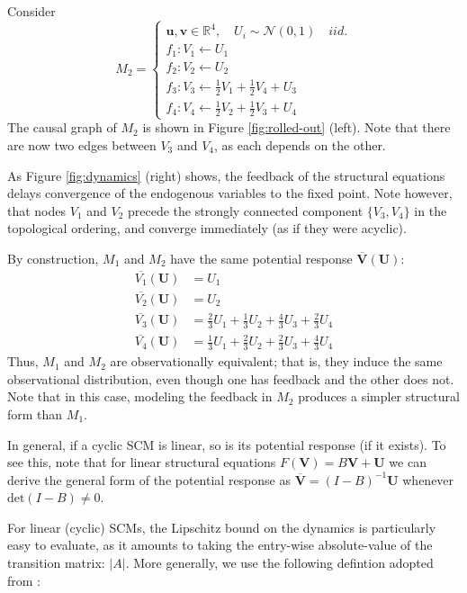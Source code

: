 \documentclass[12pt]{article}
\begin{document}
\begin{example}\label{ex:cyclic-linear}
Consider
\[
M_2 = 
\begin{cases}
\mathbf{u}, \mathbf{v}\in \mathbb{R}^4, \quad U_i \sim \mathcal{N}(0,1) \quad iid. \\
f_1:V_1\leftarrow U_1 \\
f_2:V_2\leftarrow U_2 \\
f_3:V_3\leftarrow \frac{1}{2}V_1+\frac{1}{2}V_4+U_3 \\
f_4:V_4\leftarrow \frac{1}{2}V_2+\frac{1}{2}V_3+U_4
\end{cases}
\]
The causal graph of $M_2$ is shown in Figure \ref{fig:rolled-out} (left).
Note that there are now two edges between $V_3$ and $V_4$, as each depends on the other.

As Figure \ref{fig:dynamics} (right) shows, the feedback of the structural equations delays convergence of the endogenous variables to the fixed point. Note however, that nodes $V_1$ and $V_2$ precede the strongly connected component $\{V_3,V_4\}$ in the topological ordering, and converge immediately (as if they were acyclic).

By construction, $M_1$ and $M_2$ have the same potential response $\overline{\mathbf{V}}(\mathbf{U})$:
\begin{align*}
\overline{V_1}(\mathbf{U}) &= U_1 \\
\overline{V_2}(\mathbf{U}) &= U_2 \\
\overline{V_3}(\mathbf{U}) &= \frac{2}{3}U_1+\frac{1}{3}U_2+\frac{4}{3}U_3+\frac{2}{3}U_4 \\
\overline{V_4}(\mathbf{U}) &= \frac{1}{3}U_1+\frac{2}{3}U_2+\frac{2}{3}U_3+\frac{4}{3}U_4
\end{align*}
Thus, $M_1$ and $M_2$ are observationally equivalent; that is, they induce the same observational distribution, even though one has feedback and the other does not. Note that in this case, modeling the feedback in $M_2$ produces a simpler structural form than $M_1$.
\end{example}

In general, if a cyclic SCM is linear, so is its potential response (if it exists). To see this, note that for linear structural equations $F(\mathbf{V}) = B\mathbf{V}+\mathbf{U}$ we can derive the general form of the potential response as $\overline{\mathbf{V}}=(I-B)^{-1}\mathbf{U}$ whenever $\text{det}(I-B)\neq 0$.

For linear (cyclic) SCMs, the Lipschitz bound on the dynamics is particularly easy to evaluate, as it amounts to taking the entry-wise absolute-value of the transition matrix: $\lvert A\rvert$. More generally, we use the following defintion adopted from \cite{ReberIntrinsic}:
\end{document}
